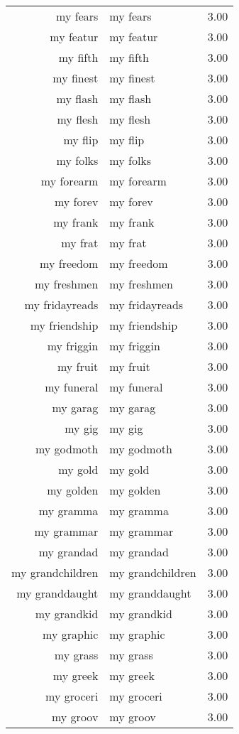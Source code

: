 \begin{table}[ht]
\begin{tabular}{rlr}
  my fears & my fears & 3.00 \\ 
  my featur & my featur & 3.00 \\ 
  my fifth & my fifth & 3.00 \\ 
  my finest & my finest & 3.00 \\ 
  my flash & my flash & 3.00 \\ 
  my flesh & my flesh & 3.00 \\ 
  my flip & my flip & 3.00 \\ 
  my folks & my folks & 3.00 \\ 
  my forearm & my forearm & 3.00 \\ 
  my forev & my forev & 3.00 \\ 
  my frank & my frank & 3.00 \\ 
  my frat & my frat & 3.00 \\ 
  my freedom & my freedom & 3.00 \\ 
  my freshmen & my freshmen & 3.00 \\ 
  my fridayreads & my fridayreads & 3.00 \\ 
  my friendship & my friendship & 3.00 \\ 
  my friggin & my friggin & 3.00 \\ 
  my fruit & my fruit & 3.00 \\ 
  my funeral & my funeral & 3.00 \\ 
  my garag & my garag & 3.00 \\ 
  my gig & my gig & 3.00 \\ 
  my godmoth & my godmoth & 3.00 \\ 
  my gold & my gold & 3.00 \\ 
  my golden & my golden & 3.00 \\ 
  my gramma & my gramma & 3.00 \\ 
  my grammar & my grammar & 3.00 \\ 
  my grandad & my grandad & 3.00 \\ 
  my grandchildren & my grandchildren & 3.00 \\ 
  my granddaught & my granddaught & 3.00 \\ 
  my grandkid & my grandkid & 3.00 \\ 
  my graphic & my graphic & 3.00 \\ 
  my grass & my grass & 3.00 \\ 
  my greek & my greek & 3.00 \\ 
  my groceri & my groceri & 3.00 \\ 
  my groov & my groov & 3.00 \\ 

\end{tabular}
\end{table}
